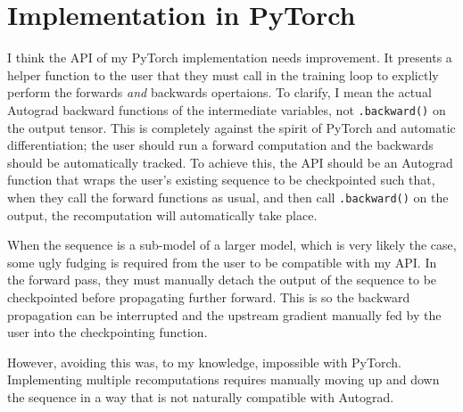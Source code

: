 \section{Implementation in PyTorch}
I think the API of my PyTorch implementation needs improvement.
It presents a helper function to the user that they must call in the training loop to explictly perform the forwards \textit{and} backwards opertaions.
To clarify, I mean the actual Autograd backward functions of the intermediate variables, not \texttt{.backward()} on the output tensor.
This is completely against the spirit of PyTorch and automatic differentiation;
the user should run a forward computation and the backwards should be automatically tracked.
To achieve this, the API should be an Autograd function that wraps the user's existing sequence to be checkpointed such that, when they call the forward functions as usual, and then call \texttt{.backward()} on the output, the recomputation will automatically take place.

When the sequence is a sub-model of a larger model, which is very likely the case, some ugly fudging is required from the user to be compatible with my API.
In the forward pass, they must manually detach the output of the sequence to be checkpointed before propagating further forward.
This is so the backward propagation can be interrupted and the upstream gradient manually fed by the user into the checkpointing function.

However, avoiding this was, to my knowledge, impossible with PyTorch.
Implementing multiple recomputations requires manually moving up and down the sequence in a way that is not naturally compatible with Autograd.
